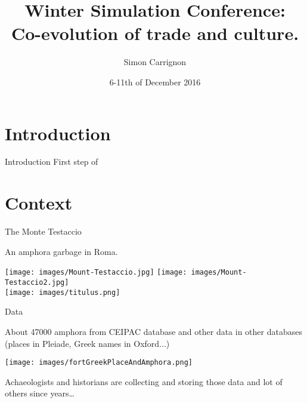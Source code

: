 \documentclass[8pt, handout=show,notes=show]{beamer}
\title{
	Winter Simulation Conference:\\
	Co-evolution of trade and culture.
}
\date{6-11th of December 2016}
\author{Simon Carrignon}
\begin{document}
\begin{frame}
	\maketitle

\end{frame}

\section{Introduction}
\begin{frame}{Introduction}
	First step of 	
\end{frame}



\section{Context}

\begin{frame}{The Monte Testaccio}

	An amphora garbage in Roma.\\

	\begin{center}
		\texttt{[image: images/Mount-Testaccio.jpg]}
		\hfil \texttt{[image: images/Mount-Testaccio2.jpg]}\\
		\vfill
		\texttt{[image: images/titulus.png]}

	\end{center}

\end{frame}
\begin{frame}{Data}

	About 47000 amphora from CEIPAC database and other data in other databases (places in Pleiade, Greek names in Oxford...)

	\begin{center}
		\texttt{[image: images/fortGreekPlaceAndAmphora.png]}
	\end{center}
	
	Achaeologists and historians are collecting and storing those data and lot of others since years\dots
\end{frame}
\end{document}
